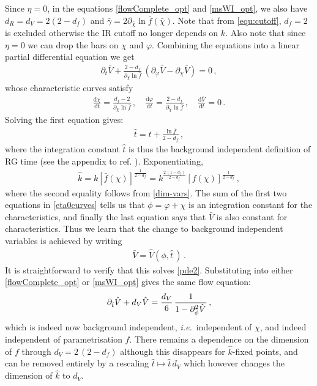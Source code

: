 \documentclass[11pt]{book} %
\newcommand\ie{\textit{i.e.}\ }
\newcommand{\vp}{\varphi}
\newcommand{\bc}{\bar \chi}
\newcommand{\bV}{\bar V}
\newcommand{\hV}{\hat V}
\newcommand{\hk}{\hat k}
\newcommand{\hatt}{\hat t}
\numberwithin{equation}{chapter}
\begin{document}
Since $\eta=0$, in the equations \eqref{flowComplete_opt} and \eqref{msWI_opt},
we also have $d_R=d_V=2(2-d_f)$ and $\bar{\gamma}=2\partial_{\bc}\ln\bar{f}(\bc)$.
Note that from \eqref{equ:cutoff}, $d_f=2$ is excluded otherwise the IR cutoff no longer depends on $k$.
Also note that since $\eta=0$ we can drop the bars on $\chi$ and $\vp$.
Combining the equations into a linear partial differential equation we get
\begin{align}
  \label{pde2}
  \partial_t\bV +\frac{2-d_f}{\partial_{\chi}\ln\bar{f}} \,
  \left(\partial_{\vp}\bV-\partial_{\chi}\bV\right) =0\,,
\end{align}
whose characteristic curves satisfy
\begin{align}
  \label{eta0curves}
  \frac{\mathrm d\chi}{\mathrm dt}=\frac{d_f-2}{\partial_{\chi}\ln\bar{f}}\,,
  \quad
  \frac{\mathrm d\vp}{\mathrm dt}=\frac{2-d_f}{\partial_{\chi}\ln\bar{f}}\,,
  \quad
  \frac{\mathrm d\bV}{\mathrm dt}=0\,.
\end{align}
Solving the first equation gives:
\begin{align}
  \label{hatt}
  \hatt = t+\frac{\ln\bar{f}}{2-d_f}\,,
\end{align}
where the integration constant $\hatt$ is thus the background independent definition of RG time
(see the appendix to ref. \cite{Dietz:2015owa}). Exponentiating,
\begin{align}
  \hk = k \left[ \bar{f}(\chi) \right]^{\frac{1}{2-d_f}} = k^{\frac{2\,(1-d_f)}{2-d_f}}
  \left[ f(\chi) \right]^{\frac{1}{2-d_f}}\,,
\end{align}
where the second equality follows from \eqref{dim-vars}.
The sum of the first two equations in \eqref{eta0curves} tells us that $\phi=\vp+\chi$ is an
integration constant for the characteristics,
and finally the last equation says that $\bV$ is also constant for characteristics.
Thus we learn that the change to background independent variables is achieved by writing
\begin{align}
  \label{background-independent}
  \bV = \hV(\phi,\hatt\,)\,.
\end{align}
It is straightforward to verify that this solves \eqref{pde2}.
Substituting into either \eqref{flowComplete_opt} or \eqref{msWI_opt} gives the same flow equation:
\begin{align}
  \label{bi-flow}
  \partial_{\hatt}\hV +d_V\hV = \frac{d_V}{6} \, \frac{1}{1-\partial^2_\phi\hV^{\vphantom{H^H}}}\,,
\end{align}
which is indeed now background independent, \ie independent of $\chi$,
and indeed independent of parametrisation $f$.
There remains a dependence on the dimension of $f$ through $d_V = 2\,(2-d_f)$ although this disappears
for $\hk$-fixed points, and can be removed entirely by a rescaling $\hatt\mapsto \hatt\, d_V$ which however
changes the dimension of $\hat{k}$ to $d_V$.
\end{document}
